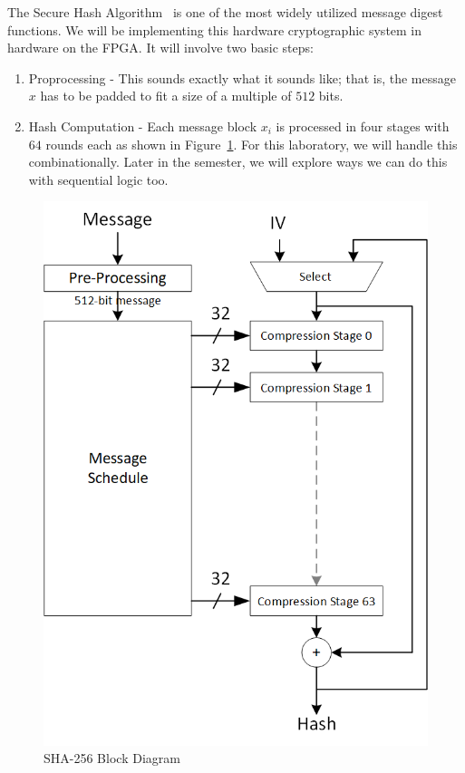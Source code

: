 \documentclass{article}
\begin{document}
The Secure Hash Algorithm~\cite{1250396} is one of the most widely
utilized message digest functions.  We will be implementing this
hardware cryptographic system in hardware on the FPGA.  It will
involve two basic steps:
\begin{enumerate}
  \item Proprocessing - This sounds exactly what it sounds like; that
    is, the message $x$ has to be padded to fit a size of a multiple
    of $512$ bits.
    \item Hash Computation - Each message block $x_i$ is processed in
      four stages with $64$ rounds each as shown in
      Figure~\ref{sha2.fig}.  For this laboratory, we will handle this
      combinationally.  Later in the semester, we will explore ways we
      can do this with sequential logic too.
\end{enumerate}
\begin{figure} [t!]
  \centering
  \includegraphics[scale=0.7]{sha256.png}
  \caption{SHA-256 Block Diagram}
  \label{sha2.fig}
\end{figure}
\end{document}
